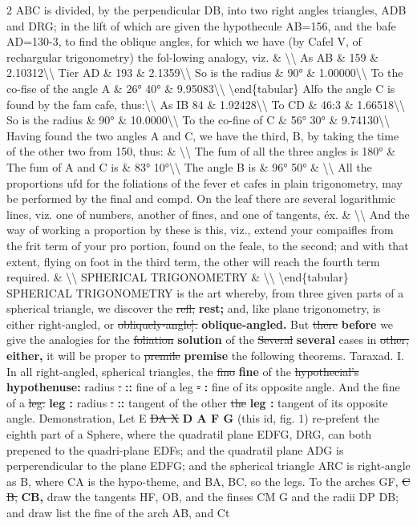 \documentclass[10pt]{article}
\begin{document}
\begin{multicols}{2}
ABC is divided, by the perpendicular DB, into two right angles triangles, ADB and DRG; in the lift of which are given the hypothecule AB=156, and the bafe AD=130-3, to find the oblique angles, for which we have (by Cafel V, of rechargular trigonometry) the fol-lowing analogy, viz. \& \textbackslash{}\textbackslash{} As AB \& 159 \& 2.10312\textbackslash{}\textbackslash{} Tier AD \& 193 \& 2.1359\textbackslash{}\textbackslash{} So is the radius \& 90° \& 1.00000\textbackslash{}\textbackslash{} To the co-fise of the angle A \& 26° 40° \& 9.95083\textbackslash{}\textbackslash{} \textbackslash{}end\{tabular\} Alfo the angle C is found by the fam cafe, thus:\textbackslash{}\textbackslash{} As IB 84 \& 1.92428\textbackslash{}\textbackslash{} To CD \& 46:3 \& 1.66518\textbackslash{}\textbackslash{} So is the radius \& 90° \& 10.0000\textbackslash{}\textbackslash{} To the co-fine of C \& 56° 30° \& 9.74130\textbackslash{}\textbackslash{} Having found the two angles A and C, we have the third, B, by taking the time of the other two from 150, thus: \& \textbackslash{}\textbackslash{} The fum of all the three angles is 180° \& The fum of A and C is \& 83° 10°\textbackslash{}\textbackslash{} The angle B is \& 96° 50° \& \textbackslash{}\textbackslash{} All the proportions ufd for the foliations of the fever et cafes in plain trigonometry, may be performed by the final and compd. On the leaf there are several logarithmic lines, viz. one of numbers, another of fines, and one of tangents, éx. \& \textbackslash{}\textbackslash{} And the way of working a proportion by these is this, viz., extend your compaifles from the frit term of your pro portion, found on the feale, to the second; and with that extent, flying on foot in the third term, the other will reach the fourth term required. \& \textbackslash{}\textbackslash{} SPHERICAL TRIGONOMETRY \& \textbackslash{}\textbackslash{} \textbackslash{}end\{tabular\} SPHERICAL TRIGONOMETRY is the art whereby, from three given parts of a spherical triangle, we discover the \sout{refl;} \textbf{rest;} and, like plane trigonometry, is either right-angled, or \sout{obliquely-angle].} \textbf{oblique-angled.} But \sout{there} \textbf{before} we give the analogies for the \sout{foliation} \textbf{solution} of the \sout{Several} \textbf{several} cases in \sout{other,} \textbf{either,} it will be proper to \sout{premile} \textbf{premise} the following theorems. Taraxad. I. In all right-angled, spherical triangles, the \sout{fino} \textbf{fine} of the \sout{hypothecial’s} \textbf{hypothenuse:} radius \sout{:} \textbf{::} fine of a leg \sout{-} \textbf{:} fine of its opposite angle. And the fine of a \sout{leg:} \textbf{leg :} radius \sout{:} \textbf{::} tangent of the other \sout{the} \textbf{leg :} tangent of its opposite angle. Demonstration, Let E \sout{DA X} \textbf{D A F G} (this id, fig. 1) re-prefent the eighth part of a Sphere, where the quadratil plane EDFG, DRG, can both prepened to the quadri-plane EDFs; and the quadratil plane ADG is perperendicular to the plane EDFG; and the spherical triangle ARC is right-angle as B, where CA is the hypo-theme, and BA, BC, so the legs. To the arches GF, \sout{C B,} \textbf{CB,} draw the tangents HF, OB, and the finses CM G and the radii DP DB; and draw list the fine of the arch AB, and Ct 
\end{multicols}
\end{document}
